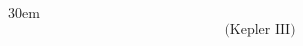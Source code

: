 \documentclass[border=4pt]{standalone}
\begin{document}
\begin{varwidth}{30em}
\large
\[ \text{(Kepler III)} \]

\end{varwidth}
\end{document}
